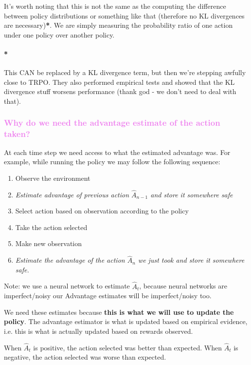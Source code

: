 \documentclass{article}
\begin{document}
It's worth noting that this is not the same as the computing the difference between policy distributions or something like that (therefore no KL divergences are necessary)\textbf{*}. We are simply measuring the probability ratio of one action under one policy over another policy.

\paragraph{*}This CAN be replaced by a KL divergence term, but then we're stepping awfully close to TRPO. They also performed empirical tests and showed that the KL divergence stuff worsens performance (thank god - we don't need to deal with that).

\textcolor{violet}{\subsubsection{Why do we need the advantage estimate of the action taken?}}

At each time step we need access to what the estimated advantage was. For example, while running the policy we may follow the following sequence:
\begin{enumerate}
    \item Observe the environment
    \item \emph{Estimate advantage of previous action \(\hat{A}_{n-1}\) and store it somewhere safe} 
    \item Select action based on observation according to the policy
    \item Take the action selected 
    \item Make new observation
    \item \emph{Estimate the advantage of the action \(\hat{A}_{n}\) we just took and store it somewhere safe.} 
\end{enumerate}

Note: we use a neural network to estimate \(\hat{A}_{t}\), because neural networks are imperfect/noisy our Advantage estimates will be imperfect/noisy too. 

We need these estimates because \textbf{this is what we will use to update the policy}. The advantage estimator is what is updated based on empirical evidence, i.e. this is what is actually updated based on rewards observed.

When \(\hat{A}_{t}\) is positive, the action selected was better than expected.
When \(\hat{A}_{t}\) is negative, the action selected was worse than expected.
\end{document}

